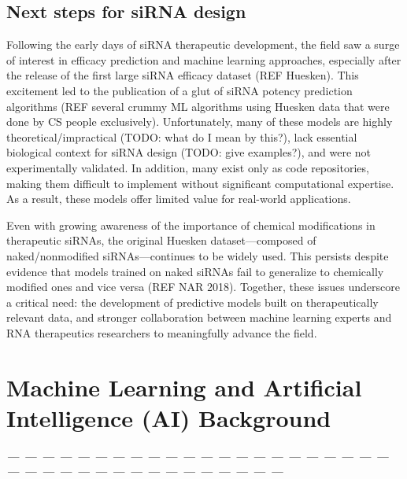 \documentclass{report}
\begin{document}
\subsection{Next steps for siRNA design}
Following the early days of siRNA therapeutic development, the field saw a surge of interest in efficacy prediction and machine learning approaches, especially after the release of the first large siRNA efficacy dataset (REF Huesken). This excitement led to the publication of a glut of siRNA potency prediction algorithms (REF several crummy ML algorithms using Huesken data that were done by CS people exclusively). Unfortunately, many of these models are highly theoretical/impractical (TODO: what do I mean by this?), lack essential biological context for siRNA design (TODO: give examples?), and were not experimentally validated. In addition, many exist only as code repositories, making them difficult to implement without significant computational expertise. As a result, these models offer limited value for real-world applications.
 
Even with growing awareness of the importance of chemical modifications in therapeutic siRNAs, the original Huesken dataset—composed of naked/nonmodified siRNAs—continues to be widely used. This persists despite evidence that models trained on naked siRNAs fail to generalize to chemically modified ones and vice versa (REF NAR 2018). Together, these issues underscore a critical need: the development of predictive models built on therapeutically relevant data, and stronger collaboration between machine learning experts and RNA therapeutics researchers to meaningfully advance the field.





\section{Machine Learning and Artificial Intelligence (AI) Background}

\textbf{\textit{--- --- --- --- --- --- --- --- --- --- --- --- --- --- --- --- --- --- --- --- --- --- --- --- --- --- --- --- --- --- --- --- --- --- --- --- --- ---}}
\end{document}
